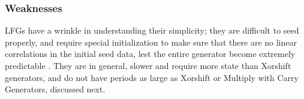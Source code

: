 \subsubsection{Weaknesses}
LFGs have a wrinkle in understanding their simplicity; they are difficult to seed properly, and require special initialization to make sure that there are no linear correlations in the initial seed data, lest the entire generator become extremely predictable \cite{Matsumoto:2007:CDI:1276927.1276928}. They are in general, slower and require more state than Xorshift generators, and do not have periods as large as Xorshift or Multiply with Carry Generators, discussed next.

